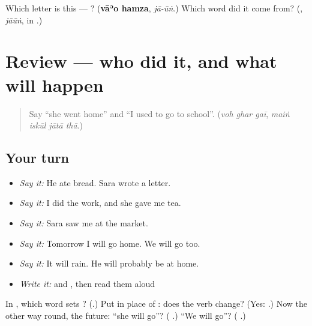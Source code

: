 \begin{tcolorbox}[breakable,colback=teal!4,colframe=teal!35!black,title={Before you move on}]
Which letter is this — ? (\textbf{vāʾo hamza}, \emph{jā-ūṅ}.) Which word did it come from? (\textbf{}, \emph{jāūṅ}, in \textbf{  }.)
\end{tcolorbox}
\section[(review)]{Review — who did it, and what will happen}

\label{lesson:UR-R265-who-did-it}



\begin{quote}
Say \textquotedblleft{}she went home\textquotedblright{} and \textquotedblleft{}I used to go to school\textquotedblright{}. (\emph{voh ghar gaī}, \emph{maiṅ iskūl jātā thā}.)
\end{quote}

\subsection*{Your turn}
\begin{itemize}
\raggedright
  \item \emph{Say it:} He ate bread. Sara wrote a letter.
  \item \emph{Say it:} I did the work, and she gave me tea.
  \item \emph{Say it:} Sara saw me at the market.
  \item \emph{Say it:} Tomorrow I will go home. We will go too.
  \item \emph{Say it:} It will rain. He will probably be at home.
  \item \emph{Write it:} \textbf{} and \textbf{}, then read them aloud
\end{itemize}

\begin{tcolorbox}[breakable,colback=teal!4,colframe=teal!35!black,title={Before you move on}]
In \textbf{   }, which word sets \textbf{}? (\textbf{}.) Put \textbf{} in place of \textbf{}: does the verb change? (Yes: \textbf{   }.) Now the other way round, the future: \textquotedblleft{}she will go\textquotedblright{}? (\textbf{  }.) \textquotedblleft{}We will go\textquotedblright{}? (\textbf{  }.)
\end{tcolorbox}
